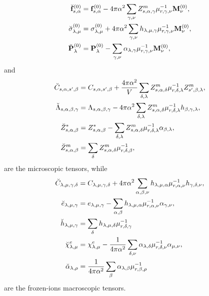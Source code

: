 \documentclass[12pt,a4paper,twoside]{report}
\begin{document}
{\begin{align}
\breve {\bf f}^{(0)}_{s,\alpha}&= {\bf f}^{(0)}_{s,\alpha} - 4 \pi
\alpha^2
\sum_{\gamma,\nu}
Z^m_{s,\alpha,\gamma} \mu^{-1}_{r,\gamma,\nu} {\bf M}^{(0)}_\nu, \\
\breve \sigma^{(0)}_{\lambda,\mu}&= \sigma^{(0)}_{\lambda,\mu}
+4 \pi \alpha^2 \sum_{\gamma,\nu} h_{\lambda,\mu,\gamma} \mu^{-1}_{r,\gamma,\nu} 
{\bf M}^{(0)}_\nu, \\
\breve {\bf P}^{(0)}_\lambda&= {\bf P}^{(0)}_\lambda -
\sum_{\gamma,\nu} \alpha_{\lambda,\gamma} \mu^{-1}_{r,\gamma,\nu} 
{\bf M}^{(0)}_\nu, 
\end{align}
and
\begin{align}
\breve C_{s,\alpha,s',\beta} &= C_{s,\alpha,s',\beta}+
{4 \pi \alpha^2 \over V}  \sum_{\delta,\lambda} Z^m_{s,\alpha,\delta}
\mu^{-1}_{r,\delta,\lambda}Z^m_{s',\beta,\lambda},\\
\breve \Lambda_{s,\alpha,\beta,\gamma} &= \Lambda_{s,\alpha,\beta,\gamma}
- 4 \pi \alpha^2 \sum_{\delta,\lambda} Z^m_{s,\alpha,\delta}
\mu^{-1}_{r,\delta,\lambda} h_{\beta,\gamma,\lambda}, \\
\breve Z^*_{s,\alpha,\beta} &= Z^*_{s,\alpha,\beta}
-\sum_{\delta,\lambda} Z^m_{s,\alpha,\delta} 
\mu^{-1}_{r,\delta,\lambda} \alpha_{\beta,\lambda}, \\
\breve Z^m_{s,\alpha,\beta} &= \sum_{\delta} Z^m_{s,\alpha,\delta} 
\mu^{-1}_{r,\delta,\beta}, 
\end{align}
are the microscopic tensors, while
\begin{align}
\breve C_{\lambda,\mu,\gamma,\delta} &=
C_{\lambda,\mu,\gamma,\delta} + 4 \pi \alpha^2 \sum_{\alpha,\beta,\nu}
h_{\lambda,\mu,\alpha} \mu^{-1}_{r,\alpha,\nu} 
h_{\gamma,\delta,\nu}, \\
\breve e_{\lambda,\mu,\gamma}&= e_{\lambda,\mu,\gamma}
-\sum_{\alpha,\beta} h_{\lambda,\mu,\alpha} \mu^{-1}_{r,\alpha,\nu}
\alpha_{\gamma,\nu}, \\
\breve h_{\lambda,\mu,\gamma}&= \sum_\delta h_{\lambda,\mu,\delta}
\mu^{-1}_{r,\delta,\gamma} \\
\breve \chi^e_{\lambda,\mu}&= \chi^e_{\lambda,\mu}
-{1\over 4 \pi \alpha^2} \sum_{\delta,\nu} \alpha_{\lambda,\delta} 
\mu^{-1}_{r,\delta,\nu} \alpha_{\mu,\nu}, \\
\breve \alpha_{\lambda,\rho} &= {1\over 4 \pi \alpha^2}
\sum_\beta \alpha_{\lambda,\beta}
\mu^{-1}_{r,\beta,\rho}
\end{align}
are the frozen-ions macroscopic tensors.
}
\\
\end{document}
